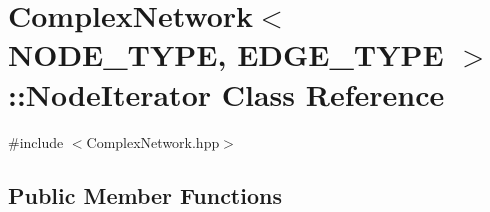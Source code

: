 \hypertarget{class_complex_network_1_1_node_iterator}{\section{Complex\+Network$<$ N\+O\+D\+E\+\_\+\+T\+Y\+P\+E, E\+D\+G\+E\+\_\+\+T\+Y\+P\+E $>$\+:\+:Node\+Iterator Class Reference}
\label{class_complex_network_1_1_node_iterator}
}


{\ttfamily \#include $<$Complex\+Network.\+hpp$>$}

\subsection*{Public Member Functions}
